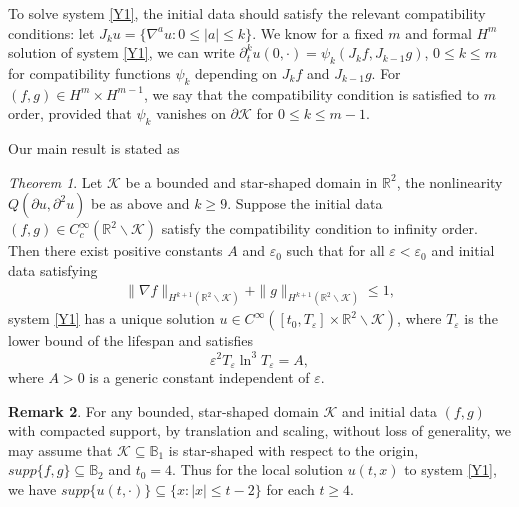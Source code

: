 \documentclass[11pt, reqno]{amsart}
\theoremstyle{definition}
\theoremstyle{remark}
\newtheorem{thm}{Theorem}[section]
\theoremstyle{definition}
\newtheorem{rem}[thm]{Remark}
\numberwithin{equation}{section}
\numberwithin{equation}{section}
\def\leq{\leqslant}
\def\geq{\geqslant}
\begin{document}
\par
To solve system \eqref{Y1}, the initial data should satisfy
the relevant compatibility conditions: let
$J_ku=\{\nabla^au:0\leq|a|\leq k\}$. We know for a fixed $m$ and
formal $H^m$ solution of system \eqref{Y1}, we can write
$\partial_t^ku(0,\cdot)=\psi_k(J_kf,J_{k-1}g)$, $0\leq k\leq m$ for
compatibility functions $\psi_k$ depending on $J_kf$ and $J_{k-1}g$.
For $(f,g)\in H^m\times H^{m-1}$, we say that the compatibility
condition is satisfied to $m$ order, provided that $\psi_k$ vanishes
on $\partial\mathcal {K}$ for $0\leq k\leq m-1$.
\par Our main result is stated as
\begin{thm}\label{thm1}
Let $\mathcal{K}$ be a bounded and star-shaped domain in
$\mathbb R^2$, the nonlinearity $Q(\partial u,\partial^2u)$
be as above and $k\geq9$. Suppose the initial data $(f,g)\in
C_c^{\infty}(\mathbb R^2\backslash\mathcal {K})$ satisfy the
compatibility condition to infinity order. Then there exist positive
constants $A$ and $\varepsilon_0$ such that for all
$\varepsilon<\varepsilon_0$ and initial data satisfying
\begin{align}\label{Y24}
\|\nabla f\|_{H^{k+1}(\mathbb R^2\backslash\mathcal
{K})}+\|g\|_{H^{k+1}(\mathbb R^2\backslash\mathcal {K})}\leq
1,
\end{align}
system \eqref{Y1} has a unique solution $u\in
C^{\infty}([t_0,T_{\varepsilon}]\times\mathbb R^2\backslash\mathcal
{K})$, where $T_{\varepsilon}$ is the lower bound of the lifespan
and satisfies 
\begin{equation}\label{lf}
\varepsilon^2T_{\varepsilon}\ln^3T_{\varepsilon}=A,
\end{equation}
where $A>0$ is a generic constant independent of $\varepsilon$.
\end{thm}
\begin{rem}\label{rem1}
For any bounded, star-shaped domain $\mathcal {K}$ and initial data $(f,g)$ with compacted support,
by translation and scaling, without loss of generality, we may assume that $\mathcal {K}\subseteq\mathbb B_1$ is star-shaped with
respect to the origin, $supp\{f,g\}\subseteq\mathbb B_2$ and $t_0=4$.
Thus for the local solution $u(t,x)$ to system \eqref{Y1}, we have  $supp\{u(t,\cdot)\}\subseteq\{x:|x|\leq t-2\}$ for each $t\geq4$.
\end{rem}
\end{document}

